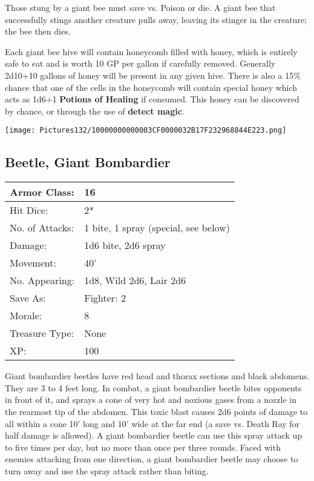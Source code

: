 \documentclass[a4paper,twoside,openany,10pt]{book}
\begin{document}
\begin{multicols}{2}
Those stung by a giant bee must save vs. Poison or die. A giant bee that successfully stings another creature pulls away, leaving its stinger in the creature; the bee then dies.

Each giant bee hive will contain honeycomb filled with honey, which is entirely safe to eat and is worth 10 GP per gallon if carefully removed. Generally 2d10+10 gallons of honey will be present in any given hive. There is also a 15\% chance that one of the cells in the honeycomb will contain special honey which acts as 1d6+1 \textbf{Potions of Healing} if consumed. This honey can be discovered by chance, or through the use of \textbf{detect magic}.

\begin{center}
	\texttt{[image: Pictures132/10000000000003CF0000032B17F232968844E223.png]}
\end{center}

\subsection*{Beetle, Giant Bombardier}\label{beetle-giant-bombardier}

\begin{tabularx}{0.48\textwidth}{@{}lX@{}}
Armor Class: & 16 \\\hline
Hit Dice: & 2* \\\hline
No. of Attacks: & 1 bite, 1 spray (special, see below) \\\hline
Damage: & 1d6 bite, 2d6 spray \\\hline
Movement: & 40' \\\hline
No. Appearing: & 1d8, Wild 2d6, Lair 2d6 \\\hline
Save As: & Fighter: 2 \\\hline
Morale: & 8 \\\hline
Treasure Type: & None \\\hline
XP: & 100 \\\hline
\end{tabularx}\medskip

Giant bombardier beetles have red head and thorax sections and black abdomens. They are 3 to 4 feet long. In combat, a giant bombardier beetle bites opponents in front of it, and sprays a cone of very hot and noxious gases from a nozzle in the rearmost tip of the abdomen. This toxic blast causes 2d6 points of damage to all within a cone 10' long and 10' wide at the far end (a save vs. Death Ray for half damage is allowed). A giant bombardier beetle can use this spray attack up to five times per day, but no more than once per three rounds. Faced with enemies attacking from one direction, a giant bombardier beetle may choose to turn away and use the spray attack rather than biting. 


\end{multicols}
\end{document}

